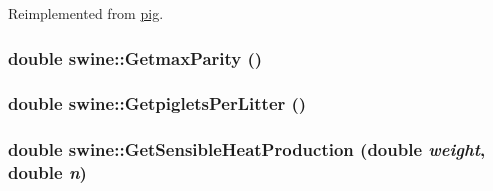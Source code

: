 Reimplemented from \hyperlink{classpig_ace82dae0cc5b75ed3051b145e12d1803}{pig}.\hypertarget{classswine_a124dd4455caf560d2fa677230dcf38c6}{
\subsubsection[{GetmaxParity}]{\setlength{\rightskip}{0pt plus 5cm}double swine::GetmaxParity ()}}
\label{classswine_a124dd4455caf560d2fa677230dcf38c6}
\hypertarget{classswine_a9571c1623a0461c8fef99a0a4f4aafb7}{
\subsubsection[{GetpigletsPerLitter}]{\setlength{\rightskip}{0pt plus 5cm}double swine::GetpigletsPerLitter ()}}
\label{classswine_a9571c1623a0461c8fef99a0a4f4aafb7}
\hypertarget{classswine_ab379109f2fea2e0fe5e649b8c59df202}{
\subsubsection[{GetSensibleHeatProduction}]{\setlength{\rightskip}{0pt plus 5cm}double swine::GetSensibleHeatProduction (double {\em weight}, \/  double {\em n})}}
\label{classswine_ab379109f2fea2e0fe5e649b8c59df202}


